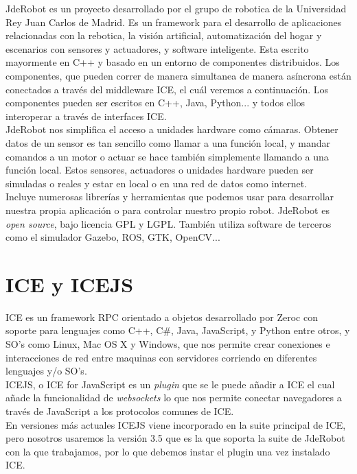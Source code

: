 JdeRobot es un proyecto desarrollado por el grupo de robotica de la Universidad Rey Juan Carlos de Madrid. Es un framework para el desarrollo de aplicaciones relacionadas con la rebotica, la visión artificial, automatización del hogar y escenarios con sensores y actuadores, y software inteligente. Esta escrito mayormente en C++ y basado en un entorno de componentes distribuidos. Los componentes, que pueden correr de manera simultanea de manera asíncrona están conectados a través del middleware ICE, el cuál veremos a continuación. Los componentes pueden ser escritos en C++, Java, Python... y todos ellos interoperar a través de interfaces ICE.\\

JdeRobot nos simplifica el acceso a unidades hardware como cámaras. Obtener datos de un sensor es tan sencillo como llamar a una función local, y mandar comandos a un motor o actuar se hace también simplemente llamando a una función local. Estos sensores, actuadores o unidades hardware pueden ser simuladas o reales y estar en local o en una red de datos como internet.\\

Incluye numerosas librerías y herramientas que podemos usar para desarrollar nuestra propia aplicación o para controlar nuestro propio robot. JdeRobot es \textit{open source}, bajo licencia GPL y LGPL. También utiliza software de terceros como el simulador Gazebo, ROS, GTK, OpenCV...\\

\section{ICE y ICEJS}

ICE es un framework RPC orientado a objetos desarrollado por Zeroc con soporte para lenguajes como C++, C\#, Java, JavaScript, y Python entre otros, y SO's como Linux, Mac OS X y Windows, que nos permite crear conexiones e interacciones de red entre maquinas con servidores corriendo en diferentes lenguajes y/o SO's.\\

ICEJS, o ICE for JavaScript es un \textit{plugin} que se le puede añadir a ICE el cual añade la funcionalidad de \textit{websockets} lo que nos permite conectar navegadores a través de JavaScript a los protocolos comunes de ICE. \\

En versiones más actuales ICEJS viene incorporado en la suite principal de ICE, pero nosotros usaremos la versión 3.5 que es la que soporta la suite de JdeRobot con la que trabajamos, por lo que debemos instar el plugin una vez instalado ICE.\\

